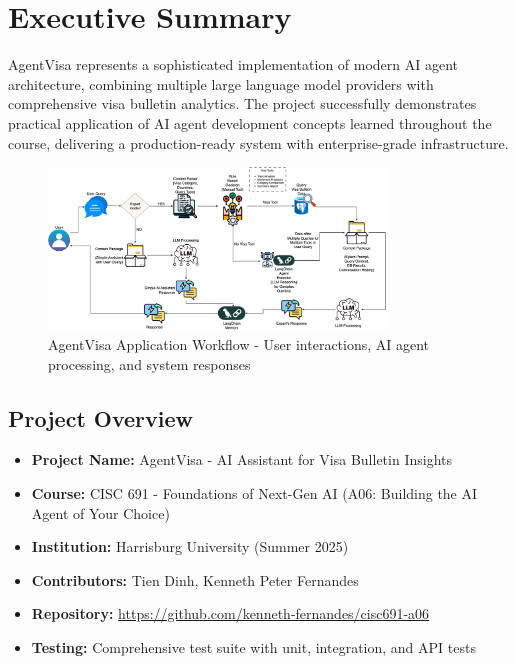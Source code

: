 \documentclass[11pt,a4paper]{article}
\begin{document}
\newpage
\tableofcontents
\newpage

\section{Executive Summary}

AgentVisa represents a sophisticated implementation of modern AI agent architecture, combining multiple large language model providers with comprehensive visa bulletin analytics. The project successfully demonstrates practical application of AI agent development concepts learned throughout the course, delivering a production-ready system with enterprise-grade infrastructure.

\begin{figure}[h!]
\centering
\includegraphics[width=0.8\textwidth]{application-workflow.png}
\caption{AgentVisa Application Workflow - User interactions, AI agent processing, and system responses}
\label{fig:workflow}
\end{figure}

\subsection{Project Overview}
\begin{itemize}[itemsep=0.5em]
    \item \textbf{Project Name:} AgentVisa - AI Assistant for Visa Bulletin Insights
    \item \textbf{Course:} CISC 691 - Foundations of Next-Gen AI (A06: Building the AI Agent of Your Choice)
    \item \textbf{Institution:} Harrisburg University (Summer 2025)
    \item \textbf{Contributors:} Tien Dinh, Kenneth Peter Fernandes
    \item \textbf{Repository:} \url{https://github.com/kenneth-fernandes/cisc691-a06}
    \item \textbf{Testing:} Comprehensive test suite with unit, integration, and API tests
\end{itemize}
\end{document}
